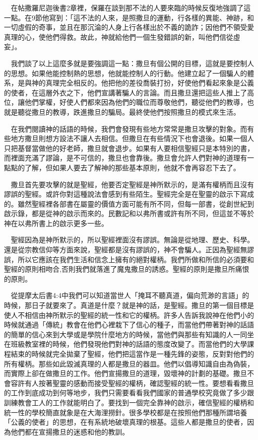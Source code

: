 \documentclass{book}
\begin{document}
　在帖撒羅尼迦後書2章裡，保羅在談到那不法的人要來臨的時候反復地強調了這一點。在9節他寫到：「這不法的人來，是照撒旦的運動，行各樣的異能、神跡，和一切虛假的奇事，並且在那沉淪的人身上行各樣出於不義的詭詐；因他們不領受愛真理的心，使他們得救。故此，神就給他們一個生發錯誤的新，叫他們信從虛妄」。

　我們談了以上這麼多就是要強調這一點：撒旦有個公開的目標，這就是要控制人的思想。如果他能控制熱的思想，他就能控制人的行動。他建立起了一個騙人的體系，是與神的真理完全相反的。他把他的差役喬裝打扮，好使他們看起來象是公義的使者，在這層外衣之下，他們宣講著騙人的言論。而且撒旦還把這些人推上了高位，讓他們掌權，好使人們都來因為他們的職位而尊敬他們，聽從他們的教導，也就是聽從撒旦的教導，跌進撒旦的騙局。最終使他們按照撒旦的模式來生活。

　在我們閱讀神的話語的時候，我們會發現有些地方常常是撒旦攻擊的對象。而有些地方撒旦則想方設法不讓人去相信。但撒旦在有些情況下也會退後。如果一個人只把基督當做他的好老師，撒旦就會退步。如果有人要相信聖經只是本特別的書，而裡面充滿了謬論，是不可信的，撒旦也會靠後。撒旦會允許人們對神的道理有一點點的了解，但如果人要去了解神的那些基本原則，他就不會再容忍下去了。

　撒旦首先要攻擊的就是聖經，他要否定聖經是神所默示的，是滿有權柄而且沒有謬誤的聖經。或許你對這種說法會感到有些陌生。聖經完全是在聖靈的啟示下寫成的。雖然聖經裡各部書在屬靈的價值方面可能有所不同，但每一部書，從創世紀到啟示錄，都是從神的啟示而來的。民數記和以弗所書或許有所不同，但這並不等於神在以弗所書上的啟示更多一些。

　聖經因為是神所默示的，所以聖經裡面沒有謬誤。無論是從地理、歷史、科學。還是從宗教信仰等方面來說，聖經都是沒有謬誤的，神不會騙人。正因為聖經無謬誤，所以它應該在我們生活和信念上擁有的絕對權柄。我們所做和所信的必須要和聖經的原則相吻合,否則我們就落進了魔鬼撒旦的誘惑。聖經的原則是撒旦所痛恨的原則。

　從提摩太后書4:4中我們可以知道當世人「掩耳不聽真道，偏向荒渺的言語」的時候，那日子就要來了。真道是什麼？就是神的話，是聖經。撒旦的第一個目標是使人不相信由神所默示的聖經的統一性和它的權柄。許多人告訴我說神在他們小的時候就通過「傳統」教會在他們心裡栽下了信心的種子，而當他們帶著對神的話語的簡單的信心來到大學或是學院什麼地方的時候，當他們與那些有知識的人一同坐在班級教室裡的時候，他們發現他們對神的話語的態度改變了。而當他們的大學課程結束的時候就完全拋棄了聖經，他們把這當作是一種先鋒的姿態，反對對他們的所有權柄。那些如此毀滅真理的人都是撒旦的器皿。他們以倡導知識自由為偽裝，而實際上卻在做撒旦的工作。他們宣揚撒旦的道理，毀壞神的計劃的基礎。撒旦不會容許有人按著聖靈的感動而接受聖經的權柄，確認聖經的統一性。要想看看撒旦的工作到底成功到何等地步，我們只需要看看我們國家的普通學校究竟做了多少跟訓練教會工人的工作就能明白了。要找到一個完全靠神的啟示，確信聖經的權柄和統一性的學校簡直就象是在大海浬撈針。很多學校都是在按照他們那種所謂培養「公義的使者」的思想，在有系統地破壞真理的根基。這些人都是撒旦的使者，因為他們都在宣揚撒旦的迷惑和他的教訓。
\end{document}
